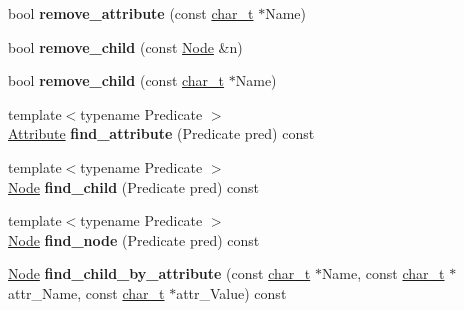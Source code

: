\begin{DoxyCompactItemize}
\item 
\hypertarget{classphys_1_1xml_1_1Node_a0c1f1f7b2dfecafd0b84fb0e90bbda5c}{
bool {\bfseries remove\_\-attribute} (const \hyperlink{namespacephys_1_1xml_afc87705cd1c2917d87b879715a2d8f6e}{char\_\-t} $\ast$Name)}
\label{d7/d0a/classphys_1_1xml_1_1Node_a0c1f1f7b2dfecafd0b84fb0e90bbda5c}

\item 
\hypertarget{classphys_1_1xml_1_1Node_a2cf35b26227f6067a25a2ae1647e8f31}{
bool {\bfseries remove\_\-child} (const \hyperlink{classphys_1_1xml_1_1Node}{Node} \&n)}
\label{d7/d0a/classphys_1_1xml_1_1Node_a2cf35b26227f6067a25a2ae1647e8f31}

\item 
\hypertarget{classphys_1_1xml_1_1Node_a8291a274fba998f4db49407a59abcf5b}{
bool {\bfseries remove\_\-child} (const \hyperlink{namespacephys_1_1xml_afc87705cd1c2917d87b879715a2d8f6e}{char\_\-t} $\ast$Name)}
\label{d7/d0a/classphys_1_1xml_1_1Node_a8291a274fba998f4db49407a59abcf5b}

\item 
\hypertarget{classphys_1_1xml_1_1Node_a59e43a51c83065e02fea2f39a37d84f0}{
{\footnotesize template$<$typename Predicate $>$ }\\\hyperlink{classphys_1_1xml_1_1Attribute}{Attribute} {\bfseries find\_\-attribute} (Predicate pred) const }
\label{d7/d0a/classphys_1_1xml_1_1Node_a59e43a51c83065e02fea2f39a37d84f0}

\item 
\hypertarget{classphys_1_1xml_1_1Node_aa46f1a55d5fead8ea4cc68235e45f3fc}{
{\footnotesize template$<$typename Predicate $>$ }\\\hyperlink{classphys_1_1xml_1_1Node}{Node} {\bfseries find\_\-child} (Predicate pred) const }
\label{d7/d0a/classphys_1_1xml_1_1Node_aa46f1a55d5fead8ea4cc68235e45f3fc}

\item 
\hypertarget{classphys_1_1xml_1_1Node_af755f4925f6839e0f8a768cfc3b265d4}{
{\footnotesize template$<$typename Predicate $>$ }\\\hyperlink{classphys_1_1xml_1_1Node}{Node} {\bfseries find\_\-node} (Predicate pred) const }
\label{d7/d0a/classphys_1_1xml_1_1Node_af755f4925f6839e0f8a768cfc3b265d4}

\item 
\hypertarget{classphys_1_1xml_1_1Node_a6a44505fc526dfb003238a648309dab3}{
\hyperlink{classphys_1_1xml_1_1Node}{Node} {\bfseries find\_\-child\_\-by\_\-attribute} (const \hyperlink{namespacephys_1_1xml_afc87705cd1c2917d87b879715a2d8f6e}{char\_\-t} $\ast$Name, const \hyperlink{namespacephys_1_1xml_afc87705cd1c2917d87b879715a2d8f6e}{char\_\-t} $\ast$attr\_\-Name, const \hyperlink{namespacephys_1_1xml_afc87705cd1c2917d87b879715a2d8f6e}{char\_\-t} $\ast$attr\_\-Value) const }
\label{d7/d0a/classphys_1_1xml_1_1Node_a6a44505fc526dfb003238a648309dab3}


\end{DoxyCompactItemize}
